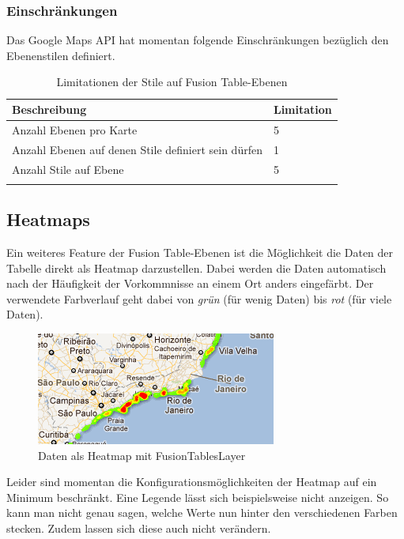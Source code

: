 \subsubsection{Einschränkungen}
\label{fusiontableslayer-styles-restrictions}
Das Google Maps API hat momentan folgende Einschränkungen bezüglich den Ebenenstilen definiert.

\begin{longtable}{|l|l|}
\hline 
\textbf{Beschreibung} & \textbf{Limitation} \\ 
\hline 
Anzahl Ebenen pro Karte & 5 \\ 
\hline 
Anzahl Ebenen auf denen Stile definiert sein dürfen & 1 \\ 
\hline 
Anzahl Stile auf Ebene & 5 \\ 
\hline 
\caption{Limitationen der Stile auf Fusion Table-Ebenen}
\label{fusiontableslayer-stlyes-limitations}
\end{longtable} 

\subsection{Heatmaps}
Ein weiteres Feature der Fusion Table-Ebenen ist die Möglichkeit die Daten der Tabelle direkt als Heatmap darzustellen. Dabei werden die Daten automatisch nach der Häufigkeit der Vorkommnisse an einem Ort anders eingefärbt. Der verwendete Farbverlauf geht dabei von \emph{grün} (für wenig Daten) bis \emph{rot} (für viele Daten).

\begin{figure}[!ht]
	\centering
	\includegraphics{images/einfuehrung/gmap_fusiontableslayer_heatmap}
	\caption{Daten als Heatmap mit FusionTablesLayer}
	\label{fusiontableslayer-heatmap}
\end{figure}

Leider sind momentan die Konfigurationsmöglichkeiten der Heatmap auf ein Minimum beschränkt. Eine Legende lässt sich beispielsweise nicht anzeigen. So kann man nicht genau sagen, welche Werte nun hinter den verschiedenen Farben stecken. Zudem lassen sich diese auch nicht verändern.

